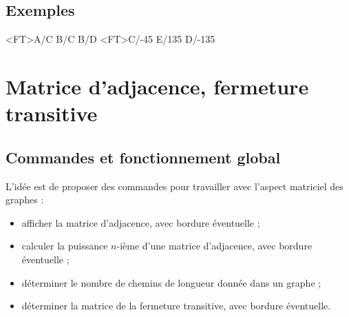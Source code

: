 \documentclass[french,a4paper,11pt]{article}
\begin{document}
{{\subsection{Exemples}

\begin{DemoCode}[]
\begin{GrapheTikz}
	[DimensionSommets=14pt,Police=\bfseries\sffamily,CouleurSommets={blue/orange}]
\end{GrapheTikz}
\end{DemoCode}

\begin{DemoCode}[]
\begin{GrapheTikz}
	\GrphTraceAretes[AngleGauche]<FT>{A/C B/C B/D}
	\GrphTraceAretes[Boucle]<FT>{C/-45 E/135 D/-135}
\end{GrapheTikz}
\end{DemoCode}

\pagebreak

\section{Matrice d'adjacence, fermeture transitive}

\subsection{Commandes et fonctionnement global}

\begin{tipblock}
L'idée est de proposer des commandes pour travailler avec l'aspect matriciel des graphes :

\begin{itemize}
	\item afficher la matrice d'adjacence, avec bordure éventuelle ;
	\item calculer la puissance $n$-ième d'une matrice d'adjacence, avec bordure éventuelle ;
	\item déterminer le nombre de chemins de longueur donnée dans un graphe ;
	\item déterminer la matrice de la fermeture transitive, avec bordure éventuelle.
\end{itemize}


\end{tipblock}}}
\end{document}
